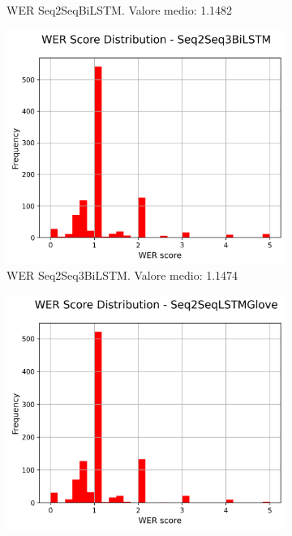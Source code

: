 \begin{figure}[H]
\begin{subfigure}{0.22\textwidth}
        \caption{WER Seq2SeqBiLSTM. Valore medio: 1.1482}
    \end{subfigure}
    \hfill
    \begin{subfigure}{0.22\textwidth}
        \centering
        \includegraphics[width=\textwidth]{media/Seq2Seq3BiLSTM_wer_scores.png}
        \caption{WER Seq2Seq3BiLSTM. Valore medio: 1.1474}
    \end{subfigure}
    \hfill
    \begin{subfigure}{0.22\textwidth}
        \centering
        \includegraphics[width=\textwidth]{media/Seq2SeqLSTMGlove_wer_scores.png}

\end{subfigure}
\end{figure}
